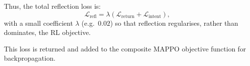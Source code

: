 Thus, the total reflection loss is:
\begin{equation}
    \mathcal{L}_{\text{refl}} = \lambda \left( \mathcal{L}_{\text{return}} + \mathcal{L}_{\text{intent}} \right),
\end{equation}
with a small coefficient $\lambda$ (e.g.\ $0.02$) so that reflection regularises, rather than dominates, the RL objective.

This loss is returned and added to the composite MAPPO objective function for backpropagation.





        
